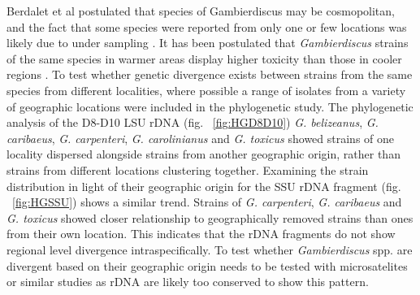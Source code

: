 \documentclass[12pt]{article}
\begin{document}
Berdalet et al postulated that species of Gambierdiscus may be cosmopolitan, and the fact that some species were reported from only one or few locations was likely due to under sampling \citep{litaker2010global}. It has been postulated that \textit{Gambierdiscus} strains of the same species  in warmer areas display higher toxicity than those in cooler regions \citep{bomber1989epiphytism}. To test whether genetic divergence exists between strains from the same species from different localities, where possible a range of isolates from a variety of geographic locations were included in the phylogenetic study. The phylogenetic analysis of the D8-D10 LSU rDNA (fig. ~\ref{fig:HGD8D10})  \emph{G. belizeanus}, \emph{G. caribaeus}, \emph{G. carpenteri},  \emph{G. carolinianus} and \emph{G. toxicus} showed strains of one locality dispersed alongside strains from another geographic origin, rather than strains from different locations clustering together. Examining the strain distribution in light of their geographic origin for the SSU rDNA fragment (fig. ~\ref{fig:HGSSU}) shows a similar trend. Strains of \emph{G. carpenteri}, \emph{G. caribaeus} and \emph{G. toxicus} showed closer relationship to geographically removed strains than ones from their own location.
This indicates that the rDNA fragments do not show regional level divergence intraspecifically. To test whether \emph{Gambierdiscus} spp. are divergent based on their geographic origin needs to be tested with microsatelites or similar studies as rDNA are likely too conserved to show this pattern.
\end{document}

